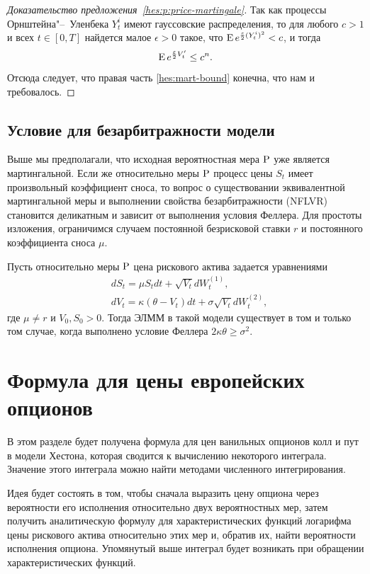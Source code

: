 \begin{proof}[Доказательство предложения~\ref{hes:p:price-martingale}]
Так как процессы Орнштейна"--~Уленбека $Y_t^i$ имеют гауссовские распределения, то для любого $c>1$ и всех $t\in[0,T]$ найдется малое $\epsilon>0$ такое, что $\E e^{\frac\epsilon2 (Y_t^i)^2} < c$, и тогда
\[
\E e^{\frac\epsilon2 V_t'} \le c^n.
\]
Отсюда следует, что правая часть \eqref{hes:mart-bound} конечна, что нам и требовалось.
\end{proof}


\subsection{Условие для безарбитражности модели \difficult}

Выше мы предполагали, что исходная вероятностная мера $\P$ уже является мартингальной.
Если же относительно меры $\P$ процесс цены $S_t$ имеет произвольный коэффициент сноса, то вопрос о существовании эквивалентной мартингальной меры и выполнении свойства безарбитражности (NFLVR) становится деликатным и зависит от выполнения условия Феллера.
Для простоты изложения, ограничимся случаем постоянной безрисковой ставки $r$ и постоянного коэффициента сноса $\mu$.

\begin{proposition}
Пусть относительно меры $\P$ цена рискового актива задается уравнениями
\begin{align*}
&d S_t = \mu S_t dt + \sqrt{V_t} d W_t^{(1)},\\
&d V_t = \kappa(\theta-V_t)dt + \sigma \sqrt{V_t} d W_t^{(2)},
\end{align*}
где $\mu\neq r$ и $V_0,S_0>0$.
Тогда ЭЛММ в такой модели существует в том и только том случае, когда выполнено условие Феллера $2\kappa\theta\ge \sigma^2$.
\end{proposition}


\section{Формула для цены европейских опционов}

В этом разделе будет получена формула для цен ванильных опционов колл и пут в модели Хестона, которая сводится к вычислению некоторого интеграла.
Значение этого интеграла можно найти методами численного интегрирования.

Идея будет состоять в том, чтобы сначала выразить цену опциона через вероятности его исполнения относительно двух вероятностных мер, затем получить аналитическую формулу для характеристических функций логарифма цены рискового актива относительно этих мер и, обратив их, найти вероятности исполнения опциона.
Упомянутый выше интеграл будет возникать при обращении характеристических функций.

